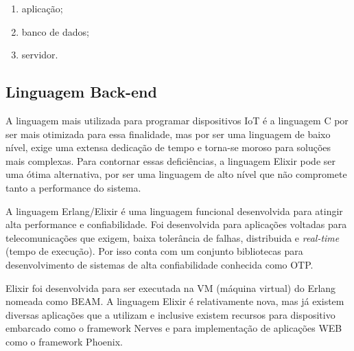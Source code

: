 \documentclass[../../layout.tex]{subfiles}
\begin{document}
\begin{enumerate}[label=\alph*)]
\itemsep0em
    \item aplicação;
    \item banco de dados;
    \item servidor.
\end{enumerate}

\subsection{Linguagem Back-end}
\hspace*{3em}A linguagem mais utilizada para programar dispositivos IoT é a linguagem C por ser mais otimizada para essa finalidade, mas por ser uma linguagem de baixo nível, exige uma extensa dedicação de tempo e torna-se moroso para soluções mais complexas. Para contornar essas deficiências, a linguagem Elixir pode ser uma ótima alternativa, por ser uma linguagem de alto nível que não compromete tanto a performance do sistema.\par
A linguagem Erlang/Elixir é uma linguagem funcional desenvolvida para atingir alta performance e confiabilidade. Foi desenvolvida para aplicações voltadas para telecomunicações que exigem, baixa tolerância de falhas, distribuida e \emph{real-time} (tempo de execução). Por isso conta com um conjunto bibliotecas para desenvolvimento de sistemas de alta confiabilidade conhecida como OTP.\par
Elixir foi desenvolvida para ser executada na VM (máquina virtual) do Erlang nomeada como BEAM. A linguagem Elixir é relativamente nova, mas já existem diversas aplicações que a utilizam e inclusive existem recursos para dispositivo embarcado como o framework Nerves \cite{ElixirorIoT} e para implementação de aplicações WEB como o framework Phoenix.
\end{document}

